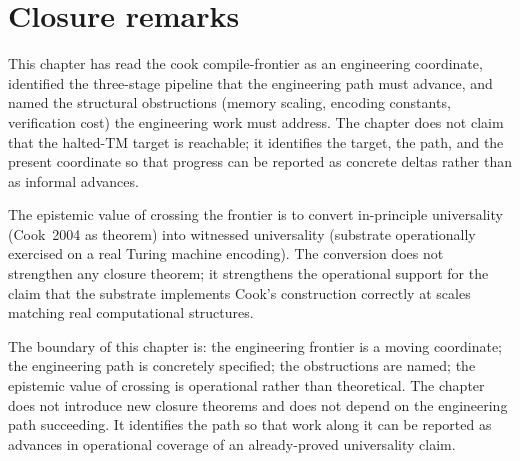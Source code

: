 \section{Closure remarks}
\label{sec:cook-frontier-closure}

This chapter has read the cook compile-frontier as an engineering coordinate, identified the three-stage pipeline that the engineering path must advance, and named the structural obstructions (memory scaling, encoding constants, verification cost) the engineering work must address. The chapter does not claim that the halted-TM target is reachable; it identifies the target, the path, and the present coordinate so that progress can be reported as concrete deltas rather than as informal advances.

The epistemic value of crossing the frontier is to convert in-principle universality (Cook~2004 as theorem) into witnessed universality (substrate operationally exercised on a real Turing machine encoding). The conversion does not strengthen any closure theorem; it strengthens the operational support for the claim that the substrate implements Cook's construction correctly at scales matching real computational structures.

The boundary of this chapter is: the engineering frontier is a moving coordinate; the engineering path is concretely specified; the obstructions are named; the epistemic value of crossing is operational rather than theoretical. The chapter does not introduce new closure theorems and does not depend on the engineering path succeeding. It identifies the path so that work along it can be reported as advances in operational coverage of an already-proved universality claim.

